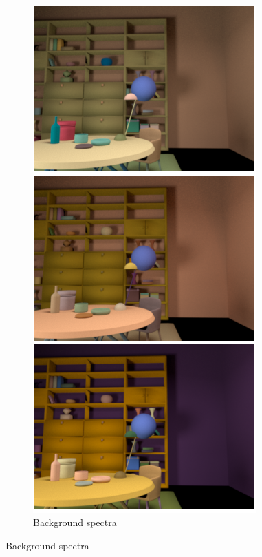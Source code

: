 \documentclass{jov}
\begin{document}
\begin{figure}
\begin{subfigure}[b]{0.18 \textwidth}
        \label{fig:targetVariation}
    \end{subfigure}
    ~
    \begin{subfigure}[b]{0.18 \textwidth}
    \centering
        \caption{Background spectra}
        \includegraphics[width=\textwidth]{../Figures/Figure5/Figure5_b.png}

\end{subfigure}
\end{figure}
\end{document}
